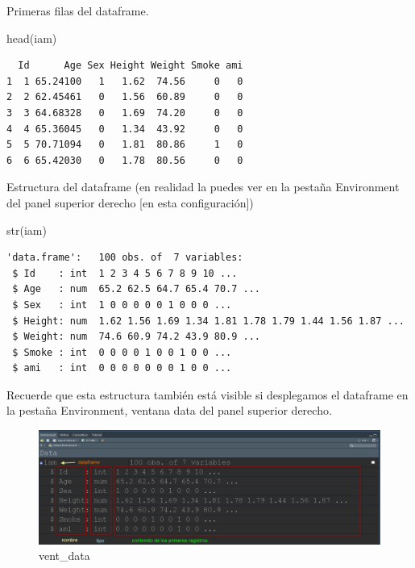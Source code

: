 \documentclass[
  letterpaper,
  DIV=11,
  numbers=noendperiod]{scrreprt}
\newenvironment{Shaded}{\begin{snugshade}}{\end{snugshade}}
\newcommand{\FunctionTok}[1]{\textcolor[rgb]{0.28,0.35,0.67}{#1}}
\newcommand{\NormalTok}[1]{\textcolor[rgb]{0.00,0.23,0.31}{#1}}
\begin{document}
Primeras filas del dataframe.

\begin{Shaded}
\begin{Highlighting}[]
\FunctionTok{head}\NormalTok{(iam)}
\end{Highlighting}
\end{Shaded}

\begin{verbatim}
  Id      Age Sex Height Weight Smoke ami
1  1 65.24100   1   1.62  74.56     0   0
2  2 62.45461   0   1.56  60.89     0   0
3  3 64.68328   0   1.69  74.20     0   0
4  4 65.36045   0   1.34  43.92     0   0
5  5 70.71094   0   1.81  80.86     1   0
6  6 65.42030   0   1.78  80.56     0   0
\end{verbatim}

Estructura del dataframe (en realidad la puedes ver en la pestaña
Environment del panel superior derecho {[}en esta configuración{]})

\begin{Shaded}
\begin{Highlighting}[]
\FunctionTok{str}\NormalTok{(iam)}
\end{Highlighting}
\end{Shaded}

\begin{verbatim}
'data.frame':   100 obs. of  7 variables:
 $ Id    : int  1 2 3 4 5 6 7 8 9 10 ...
 $ Age   : num  65.2 62.5 64.7 65.4 70.7 ...
 $ Sex   : int  1 0 0 0 0 0 1 0 0 0 ...
 $ Height: num  1.62 1.56 1.69 1.34 1.81 1.78 1.79 1.44 1.56 1.87 ...
 $ Weight: num  74.6 60.9 74.2 43.9 80.9 ...
 $ Smoke : int  0 0 0 0 1 0 0 1 0 0 ...
 $ ami   : int  0 0 0 0 0 0 0 1 0 0 ...
\end{verbatim}

Recuerde que esta estructura también está visible si desplegamos el
dataframe en la pestaña Environment, ventana data del panel superior
derecho.

\begin{figure}

{\centering \includegraphics{./pics/iam_en_vent_data.png}

}

\caption{vent\_data}

\end{figure}
\end{document}

